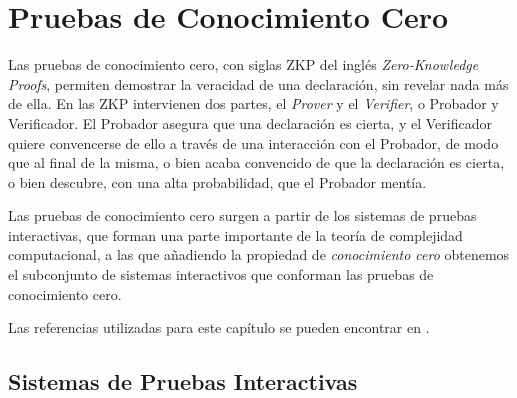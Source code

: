 \chapter{Pruebas de Conocimiento Cero}\label{ch:zkp} 


%	


%

Las pruebas de conocimiento cero, con siglas ZKP del inglés \textit{Zero-Knowledge Proofs}, permiten demostrar la veracidad de una declaración, sin revelar nada más de ella. En las ZKP intervienen dos partes, el \textit{Prover} y el \textit{Verifier}, o Probador y Verificador. El Probador asegura que una declaración es cierta, y el Verificador quiere convencerse de ello a través de una interacción con el Probador, de modo que al final de la misma, o bien acaba convencido de que la declaración es cierta, o bien descubre, con una alta probabilidad, que el Probador mentía.

Las pruebas de conocimiento cero surgen a partir de los sistemas de pruebas interactivas, que forman una parte importante de la teoría de complejidad computacional, a las que añadiendo la propiedad de \textit{conocimiento cero} obtenemos el subconjunto de sistemas interactivos que conforman las pruebas de conocimiento cero.

Las referencias utilizadas para este capítulo se pueden encontrar en \citep{pieprzyk2013fundamentals, rosen2007discrete, blum, damgardcommitment, pardo2012introduction, menezes1996handbook, stinson2005cryptography}.


\section{Sistemas de Pruebas Interactivas}

